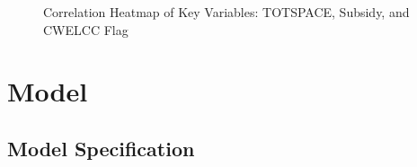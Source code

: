 \documentclass[
  letterpaper,
  DIV=11,
  numbers=noendperiod]{scrartcl}
\begin{document}
\begin{figure}


\caption{\label{fig-key}Correlation Heatmap of Key Variables: TOTSPACE,
Subsidy, and CWELCC Flag}

\end{figure}%

\section{Model}\label{model}

\subsection{Model Specification}\label{model-specification}
\end{document}

